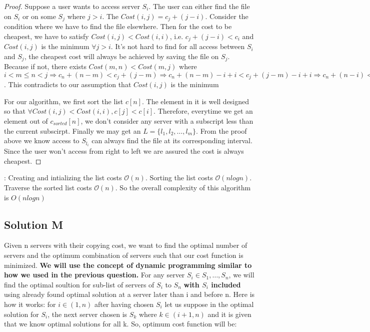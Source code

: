 \documentclass[11pt]{article}
\renewcommand{\O}{\mathcal{O}}
\begin{document}
\begin{proof}
  Suppose a user wants to access server $S_i$. The user can either find the file on $S_i$ or on some $S_j$ where $j > i$. The $Cost(i, j) = c_j + (j-i)$.
  Consider the condition where we have to find the file elsewhere. Then for the cost to be cheapest, we have to satisfy $Cost(i, j) < Cost(i, i)$, i.e. $c_j + (j-i) < c_i$ and $Cost(i, j)$ is the minimum $\forall j > i$. It's not hard to find for all access between $S_i$ and $S_j$, the cheapest cost will always be achieved by saving the file on $S_j$. Because if not, there exists $Cost(m, n) < Cost(m, j)$ where $i< m \leq n < j \Rightarrow c_n + (n-m) < c_j + (j-m) \Rightarrow c_n + (n-m) -i + i < c_j + (j-m) -i + i \Rightarrow c_n + (n-i) < c_j + (j-i) \Rightarrow Cost(i, n) < Cost(i, j)$. This contradicts to our assumption that $Cost(i, j)$ is the minimum

For our algorithm, we first sort the list $c[n]$. The element in it is well designed so that $\forall Cost(i, j) < Cost(i, i), c[j] < c[i]$. Therefore, everytime we get an element out of $c_{sorted}[n]$, we don't consider any server with a subscript less than the current subscirpt. Finally we may get an $L = \{l_1, l_2, \dots, l_m\}$. From the proof above we know access to $S_{l_i}$ can always find the file at its corresponding interval. Since the user won't access from right to left we are assured the cost is always cheapest.
\end{proof}

: Creating and intializing the list costs $\O(n)$. Sorting the list costs $\O(nlogn)$. Traverse the sorted list costs $\O(n)$. So the overall complexity of this algorithm is $O(nlogn)$

\subsection{Solution M}
Given n servers with their copying cost, we want to find the optimal number of servers and the optimum combination of servers
such that our cost function is minimized. \newline
{\bf We will use the concept of dynamic programming similar to how we used in the previous question.} \newline
For any server $S_i \in S_1, \dots , S_n$, we will find the optimal soultion for sub-list of servers of $S_i$
to $S_n$ {\bf with $S_i$ included}  using already found optimal solution at a server later than i and before n. \newline
Here is how it works:  \newline
for $i \in (1,n)$ after having chosen $S_i$ let us suppose in the optimal solution for $S_i$, the next server chosen is $S_k$
where $k \in (i+1 , n)$ and it is given that we know optimal solutions for all k.  \newline
So, optimum cost function will be: \newline
\end{document}
